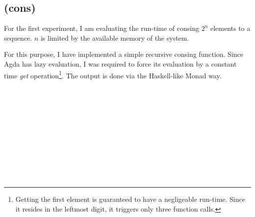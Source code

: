 \documentclass[12pt,twoside,notitlepage]{report}
\begin{document}
\subsection{(cons)}
For the first experiment, I am evaluating the run-time of consing $2^n$ elements to a sequence. $n$ is limited by the available memory of the system. 

For this purpose, I have implemented a simple recursive consing function. Since Agda has lazy evaluation, I was required to force its evaluation by a constant time \textit{get} operation\footnote{Getting the first element is guaranteed to have a negligeable run-time. Since it resides in the leftmost digit, it triggers only three function calls.}. The output is done via the Haskell-like Monad way.

\begin{code}
\\
\>[0]\<[4]%
\>[4] \AgdaSymbol{:} \AgdaSymbol{(} \AgdaSymbol{:} \AgdaSymbol{)}    \AgdaSymbol{(} \AgdaSymbol{)}\<%
\\
\>[0]\<[4]%
\>[4]  \AgdaSymbol{=} \<%
\\
\>[0]\<[4]%
\>[4] \AgdaSymbol{(} \AgdaSymbol{)} \AgdaSymbol{=} \AgdaSymbol{(} \AgdaSymbol{)}  \AgdaSymbol{(} \AgdaSymbol{)}\<%
\\
\end{code}

\begin{code}
\\
\>[0]\<[4]%
\>[4] \AgdaSymbol{=} \AgdaSymbol{(} \AgdaSymbol{(} \AgdaSymbol{)} \AgdaPostulate{>>=}\<%
\\
\>[4]\<[12]%
\>[12]    \AgdaSymbol{(} \AgdaSymbol{)} \AgdaPostulate{>>=}\<%
\\
\>[4]\<[12]%
\>[12]    \AgdaSymbol{(} \AgdaSymbol{(}\AgdaSymbol{(} \AgdaFunction{!} \AgdaSymbol{))))} \AgdaPostulate{>>=}\<%
\\
\>[4]\<[12]%
\>[12]    \AgdaSymbol{)))}\<%
\\
\end{code} 
\end{document}
